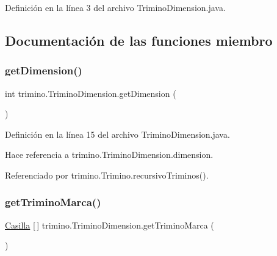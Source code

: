 Definición en la línea 3 del archivo Trimino\+Dimension.\+java.



\subsection{Documentación de las funciones miembro}
\mbox{\label{classtrimino_1_1TriminoDimension_a2b68da33e0776ee340b115c697551688}} 
\subsubsection{\texorpdfstring{getDimension()}{getDimension()}}
{\footnotesize\ttfamily int trimino.\+Trimino\+Dimension.\+get\+Dimension (\begin{DoxyParamCaption}{ }\end{DoxyParamCaption})}



Definición en la línea 15 del archivo Trimino\+Dimension.\+java.


\begin{DoxyCode}{0}

\end{DoxyCode}


Hace referencia a trimino.\+Trimino\+Dimension.\+dimension.



Referenciado por trimino.\+Trimino.\+recursivo\+Triminos().

\mbox{\label{classtrimino_1_1TriminoDimension_aec4ac732ba7d51dc64ff20ec9ab4cba9}} 
\subsubsection{\texorpdfstring{getTriminoMarca()}{getTriminoMarca()}}
{\footnotesize\ttfamily \mbox{\hyperlink{classtrimino_1_1Casilla}{Casilla}} \mbox{[}$\,$\mbox{]} trimino.\+Trimino\+Dimension.\+get\+Trimino\+Marca (\begin{DoxyParamCaption}{ }\end{DoxyParamCaption})}



